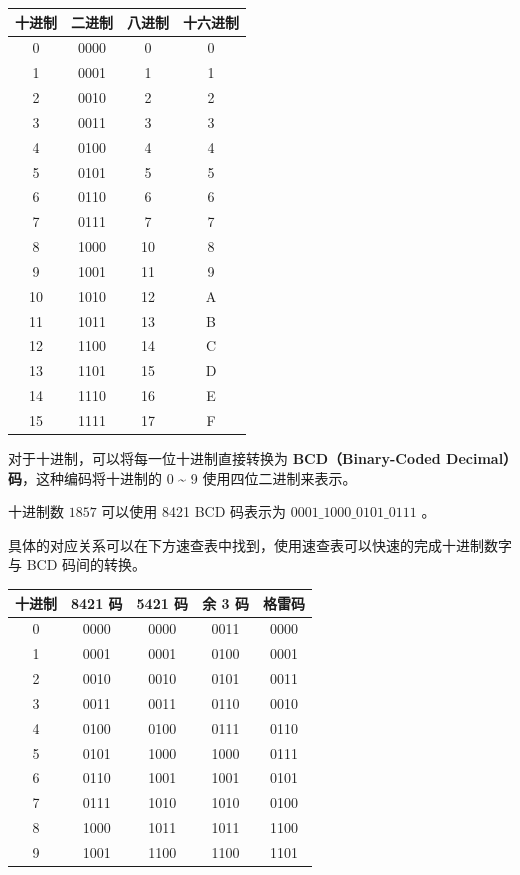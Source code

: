 \begin{longtable}{|c|c|c|c|}
\hline
\textbf{十进制} & \textbf{二进制} & \textbf{八进制} & \textbf{十六进制} \\ \hline
\endhead
0 & 0000 & 0 & 0 \\ \hline
1 & 0001 & 1 & 1 \\ \hline
2 & 0010 & 2 & 2 \\ \hline
3 & 0011 & 3 & 3 \\ \hline
4 & 0100 & 4 & 4 \\ \hline
5 & 0101 & 5 & 5 \\ \hline
6 & 0110 & 6 & 6 \\ \hline
7 & 0111 & 7 & 7 \\ \hline
8 & 1000 & 10 & 8 \\ \hline
9 & 1001 & 11 & 9 \\ \hline
10 & 1010 & 12 & A \\ \hline
11 & 1011 & 13 & B \\ \hline
12 & 1100 & 14 & C \\ \hline
13 & 1101 & 15 & D \\ \hline
14 & 1110 & 16 & E \\ \hline
15 & 1111 & 17 & F \\ \hline
\end{longtable}

对于十进制，可以将每一位十进制直接转换为 \textbf{BCD（Binary-Coded Decimal）码}，这种编码将十进制的 0 \textasciitilde{} 9 使用四位二进制来表示。

\begin{example}{}{}
  十进制数 $1857$ 可以使用 8421 BCD 码表示为 $0001\_1000\_0101\_0111$ 。
\end{example}

具体的对应关系可以在下方速查表中找到，使用速查表可以快速的完成十进制数字与 BCD 码间的转换。

\begin{longtable}{|c|c|c|c|c|}
\hline
\textbf{十进制} & \textbf{8421 码} & \textbf{5421 码} & \textbf{余 3 码} & \textbf{格雷码} \\ \hline
\endhead
0 & 0000 & 0000 & 0011 & 0000 \\ \hline
1 & 0001 & 0001 & 0100 & 0001 \\ \hline
2 & 0010 & 0010 & 0101 & 0011 \\ \hline
3 & 0011 & 0011 & 0110 & 0010 \\ \hline
4 & 0100 & 0100 & 0111 & 0110 \\ \hline
5 & 0101 & 1000 & 1000 & 0111 \\ \hline
6 & 0110 & 1001 & 1001 & 0101 \\ \hline
7 & 0111 & 1010 & 1010 & 0100 \\ \hline
8 & 1000 & 1011 & 1011 & 1100 \\ \hline
9 & 1001 & 1100 & 1100 & 1101 \\ \hline
\end{longtable}

